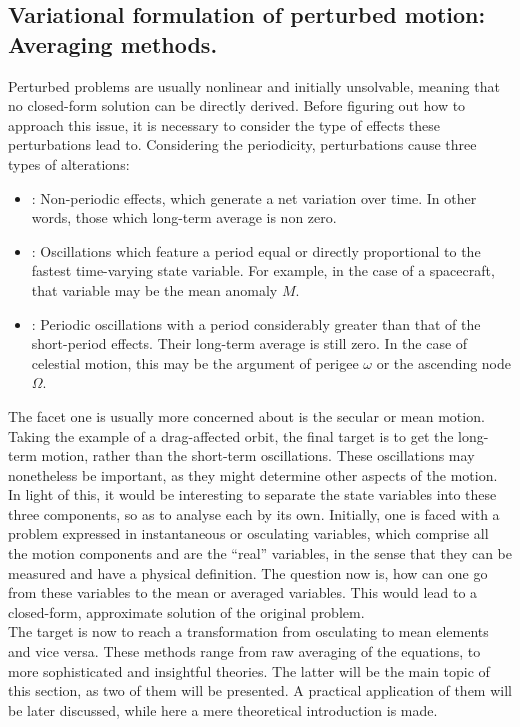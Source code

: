 	\subsection{Variational formulation of perturbed motion: Averaging methods.}\label{secCh4:Av_methods}
	\indent Perturbed problems are usually nonlinear and initially unsolvable, meaning that no closed-form solution can be directly derived. Before figuring out how to approach this issue, it is necessary to consider the type of effects these perturbations lead to. Considering the periodicity, perturbations cause three types of alterations: 
	\begin{itemize}
	\item[\GMVred{A.}] : Non-periodic effects, which generate a net variation over time. In other words, those which long-term average is non zero.
	\item[\GMVred{B.}] : Oscillations which feature a period equal or directly proportional to the fastest time-varying state variable. For example, in the case of a spacecraft, that variable may be the mean anomaly $M$.
	\item[\GMVred{C.}] : Periodic oscillations with a period considerably greater than that of the short-period effects. Their long-term average is still zero. In the case of celestial motion, this may be the argument of perigee $\omega$ or the ascending node $\Omega$.
	\end{itemize}	
	\indent The facet one is usually more concerned about is the secular or mean motion. Taking the example of a drag-affected orbit, the final target is to get the long-term motion, rather than the short-term oscillations. These oscillations may nonetheless be important, as they might determine other aspects of the motion. \\
	\indent In light of this, it would be interesting to separate the state variables into these three components, so as to analyse each by its own. Initially, one is faced with a problem expressed in instantaneous or osculating variables, which comprise all the motion components and are the ``real'' variables, in the sense that they can be measured and have a physical definition. The question now is, how can one go from these variables to the mean or averaged variables. This would lead to a closed-form, approximate solution of the original problem.\\
	\indent The target is now to reach a transformation from osculating to mean elements and vice versa. These methods range from raw averaging of the equations, to more sophisticated and insightful theories. The latter will be the main topic of this section, as two of them will be presented. A practical application of them will be later discussed, while here a mere theoretical introduction is made.\\
